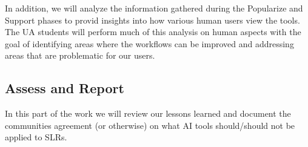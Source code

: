 In addition, we will analyze the information gathered during the Popularize and Support phases to provid insights into how various human users view the tools.
The UA students will perform much of this analysis on human aspects with the goal of identifying areas where the workflows can be improved and addressing areas that are problematic for our users.
\vspace{8pt}

\subsection{Assess and Report}\label{tion:ass}

In this part of the work we will
 review our lessons learned and document the communities agreement (or otherwise) on what AI tools should/should not be applied to SLRs.
\vspace{8pt}  
 